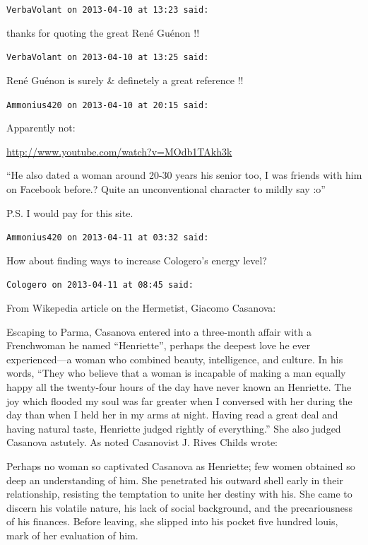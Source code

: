 \begin{footnotesize}
\begin{sffamily}
\hfill

\texttt{VerbaVolant on 2013-04-10 at 13:23 said:}

thanks for quoting the great René Guénon !!

\hfill

\texttt{VerbaVolant on 2013-04-10 at 13:25 said:}

René Guénon is surely \& definetely a great reference !!

\hfill

\texttt{Ammonius420 on 2013-04-10 at 20:15 said:}

Apparently not:

\url{http://www.youtube.com/watch?v=MOdb1TAkh3k}


``He also dated a woman around 20-30 years his senior too, I was friends with him on Facebook before.? Quite an unconventional character to mildly say :o''

P.S. I would pay for this site.

\hfill

\texttt{Ammonius420 on 2013-04-11 at 03:32 said:}

How about finding ways to increase Cologero's energy level?

\hfill

\texttt{Cologero on 2013-04-11 at 08:45 said:}

From Wikepedia article on the Hermetist, Giacomo Casanova:

\begin{quotationx}

Escaping to Parma, Casanova entered into a three-month affair with a Frenchwoman he named ``Henriette'', perhaps the deepest love he ever experienced---a woman who combined beauty, intelligence, and culture. In his words, ``They who believe that a woman is incapable of making a man equally happy all the twenty-four hours of the day have never known an Henriette. The joy which flooded my soul was far greater when I conversed with her during the day than when I held her in my arms at night. Having read a great deal and having natural taste, Henriette judged rightly of everything.'' She also judged Casanova astutely. As noted Casanovist J. Rives Childs wrote:

Perhaps no woman so captivated Casanova as Henriette; few women obtained so deep an understanding of him. She penetrated his outward shell early in their relationship, resisting the temptation to unite her destiny with his. She came to discern his volatile nature, his lack of social background, and the precariousness of his finances. Before leaving, she slipped into his pocket five hundred louis, mark of her evaluation of him.
\end{quotationx}



\end{sffamily}
\end{footnotesize}
